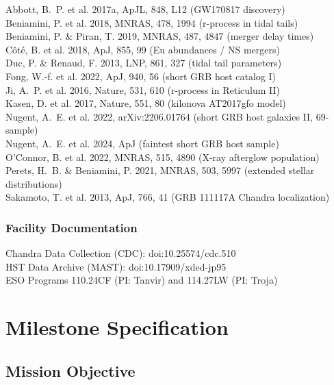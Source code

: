 \documentclass[11pt,letterpaper]{article}
\newcommand{\stageheader}[2]{%
  \noindent\colorbox{#2}{\makebox[\textwidth][l]{%
    \textcolor{white}{\bfseries\sffamily\hspace{6pt}#1\hspace{6pt}}}}%
  \vspace{0.5em}\par%
}
\begin{document}
Abbott, B.~P. et al. 2017a, ApJL, 848, L12 (GW170817 discovery) \\
Beniamini, P. et al. 2018, MNRAS, 478, 1994 (r-process in tidal tails) \\
Beniamini, P. \& Piran, T. 2019, MNRAS, 487, 4847 (merger delay times) \\
Côté, B. et al. 2018, ApJ, 855, 99 (Eu abundances / NS mergers) \\
Duc, P. \& Renaud, F. 2013, LNP, 861, 327 (tidal tail parameters) \\
Fong, W.-f. et al. 2022, ApJ, 940, 56 (short GRB host catalog I) \\
Ji, A.~P. et al. 2016, Nature, 531, 610 (r-process in Reticulum II) \\
Kasen, D. et al. 2017, Nature, 551, 80 (kilonova AT2017gfo model) \\
Nugent, A.~E. et al. 2022, arXiv:2206.01764 (short GRB host galaxies II, 69-sample) \\
Nugent, A.~E. et al. 2024, ApJ (faintest short GRB host sample) \\
O'Connor, B. et al. 2022, MNRAS, 515, 4890 (X-ray afterglow population) \\
Perets, H.~B. \& Beniamini, P. 2021, MNRAS, 503, 5997 (extended stellar distributions) \\
Sakamoto, T. et al. 2013, ApJ, 766, 41 (GRB 111117A Chandra localization) \\

\subsubsection{Facility Documentation}
Chandra Data Collection (CDC): doi:10.25574/cdc.510 \\
HST Data Archive (MAST): doi:10.17909/xded-jp95 \\
ESO Programs 110.24CF (PI: Tanvir) and 114.27LW (PI: Troja)

\newpage
\stageheader{STAGE 3 --- MISSION PACKAGE}{tertiary}

\section{Milestone Specification}

\subsection{Mission Objective}
\end{document}
